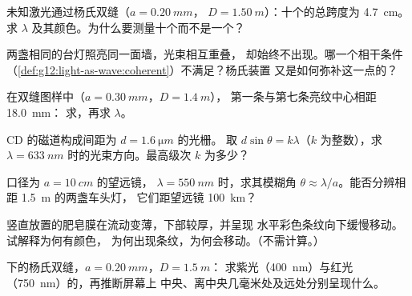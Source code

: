 \begin{exercise}[$\star\star$]\label{exo:g12:light-as-wave:7}
未知激光通过杨氏双缝（$a = \qty{0.20}{mm}$，
$D = \qty{1.50}{m}$）：十个的总跨度为 \qty{4.7}{cm}。求
$\lambda$ 及其颜色。为什么要测量十个而不是一个？
\end{exercise}

\begin{exercise}[$\star\star$]\label{exo:g12:light-as-wave:8}
两盏相同的台灯照亮同一面墙，光束相互重叠，
却始终不出现。哪一个相干条件
（\cref{def:g12:light-as-wave:coherent}）不满足？杨氏装置
又是如何弥补这一点的？
\end{exercise}

\begin{exercise}[$\star\star$]\label{exo:g12:light-as-wave:9}
在双缝图样中（$a = \qty{0.30}{mm}$，$D = \qty{1.4}{m}$），
第一条与第七条亮纹中心相距 \qty{18.0}{mm}：
求，再求 $\lambda$。
\end{exercise}

\begin{exercise}[$\star\star$]\label{exo:g12:light-as-wave:10}
CD 的磁道构成间距为 $d = \qty{1.6}{\micro m}$ 的光栅。
取 $d \sin\theta = k\lambda$（$k$ 为整数），求
$\lambda = \qty{633}{nm}$ 时的光束方向。最高级次 $k$ 为多少？
\end{exercise}

\begin{exercise}[$\star\star$]\label{exo:g12:light-as-wave:11}
口径为 $a = \qty{10}{cm}$ 的望远镜， $\lambda =
\qty{550}{nm}$ 时，求其模糊角 $\theta \approx
\lambda/a$。能否分辨相距 \qty{1.5}{m} 的两盏车头灯，
它们距望远镜 \qty{100}{km}？
\end{exercise}

\begin{exercise}[$\star\star\star$]\label{exo:g12:light-as-wave:12}
竖直放置的肥皂膜在流动变薄，下部较厚，并呈现
水平彩色条纹向下缓慢移动。试解释为何有颜色，
为何出现条纹，为何会移动。（不需计算。）
\end{exercise}

\begin{exercise}[$\star\star\star$]\label{exo:g12:light-as-wave:13}
下的杨氏双缝，$a = \qty{0.20}{mm}$，$D = \qty{1.5}{m}$：
求紫光（\qty{400}{nm}）与红光
（\qty{750}{nm}）的，再推断屏幕上
中央、离中央几毫米处及远处分别呈现什么。
\end{exercise}

